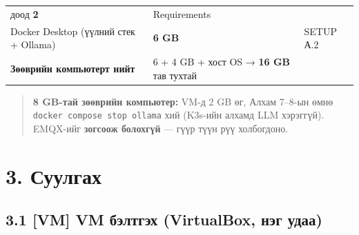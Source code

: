 \begin{longtable}[]{@{}lll@{}}
\begin{minipage}[t]{0.30\columnwidth}
доод \textbf{2}\strut
\end{minipage} & \begin{minipage}[t]{0.30\columnwidth}\raggedright
Requirements\strut
\end{minipage}\tabularnewline
\begin{minipage}[t]{0.30\columnwidth}\raggedright
Docker Desktop (үүлний стек + Ollama)\strut
\end{minipage} & \begin{minipage}[t]{0.30\columnwidth}\raggedright
\textbf{6 GB}\strut
\end{minipage} & \begin{minipage}[t]{0.30\columnwidth}\raggedright
SETUP А.2\strut
\end{minipage}\tabularnewline
\begin{minipage}[t]{0.30\columnwidth}\raggedright
\textbf{Зөөврийн компьютерт нийт}\strut
\end{minipage} & \begin{minipage}[t]{0.30\columnwidth}\raggedright
6 + 4 GB + хост OS → \textbf{16 GB} тав тухтай\strut
\end{minipage} & \begin{minipage}[t]{0.30\columnwidth}\raggedright
\strut
\end{minipage}\tabularnewline
\bottomrule
\end{longtable}\endgroup

\begin{quote}
\textbf{8 GB-тай зөөврийн компьютер:} VM-д 2 GB өг, Алхам 7--8-ын өмнө \texttt{docker\ compose\ stop\ ollama} хий (K3s-ийн алхамд LLM хэрэггүй). EMQX-ийг \textbf{зогсоож болохгүй} --- гүүр түүн рүү холбогдоно.
\end{quote}

\hypertarget{ux441ux443ux443ux43bux433ux430ux445}{%
\section{3. Суулгах}\label{ux441ux443ux443ux43bux433ux430ux445}}

\hypertarget{vm-vm-ux431ux44dux43bux442ux433ux44dux445-virtualbox-ux43dux44dux433-ux443ux434ux430ux430}{%
\subsection{3.1 {[}VM{]} VM бэлтгэх (VirtualBox, нэг удаа)}\label{vm-vm-ux431ux44dux43bux442ux433ux44dux445-virtualbox-ux43dux44dux433-ux443ux434ux430ux430}}

